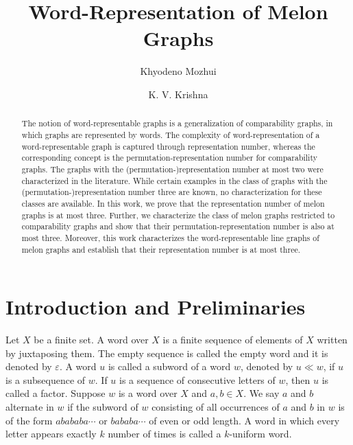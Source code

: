 \documentclass{llncs}
\begin{document}
\frontmatter         

\pagestyle{headings}  

\mainmatter             

\title{Word-Representation of Melon Graphs}



\author{Khyodeno Mozhui \and K. V. Krishna}



\maketitle         

\begin{abstract}
	The notion of word-representable graphs is a generalization of comparability graphs, in which graphs are represented by words. The complexity of word-representation of a word-representable graph is captured through representation number, whereas the corresponding concept is the permutation-representation number for comparability graphs. The graphs with the (permutation-)representation number at most two were characterized in the literature. While certain examples in the class of graphs with the (permutation-)representation number three are known, no characterization for these classes are available. In this work, we prove that the representation number of melon graphs is at most three. Further, we characterize the class of melon graphs restricted to comparability graphs and show that their permutation-representation number is also at most three. Moreover, this work characterizes the word-representable line graphs of melon graphs and establish that their representation number is at most three.
\end{abstract} 



\section{Introduction and Preliminaries}
\label{intro}
Let $X$ be a finite set. A word over $X$ is a finite sequence of elements of $X$ written by juxtaposing them. The empty sequence is called the empty word and it is denoted by $\varepsilon$. A word $u$ is called a subword of a word $w$, denoted by $u \ll w$, if  $u$ is a subsequence of $w$.  If $u$ is a sequence of consecutive letters of $w$, then $u$ is called a factor. Suppose $w$ is a word over $X$ and $a, b \in X$. We say $a$ and $b$ alternate in $w$ if the subword of $w$ consisting of all occurrences of $a$ and $b$ in $w$ is of the form $abababa\cdots$ or $bababa\cdots$ of even or odd length. A word in which every letter appears exactly $k$ number of times is called a $k$-uniform word. 
\end{document}
